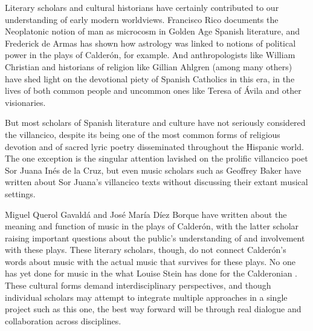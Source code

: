 Literary scholars and cultural historians have certainly contributed to our understanding of early modern worldviews. 
Francisco Rico documents the Neoplatonic notion of man as microcosm in Golden Age Spanish literature, and Frederick de Armas has shown how astrology was linked to notions of political power in the plays of Calderón, for example.%
	\autocites{Rico:PequenoMundo}{DeArmas:Astraea}
And anthropologists like William Christian and historians of religion like Gillian Ahlgren (among many others) have shed light on the devotional piety of Spanish Catholics in this era, in the lives of both common people and uncommon ones like Teresa of Ávila and other visionaries.%
	\autocites{Christian:LocalReligion}{Christian:PersonAndGod}{Ahlgren:TeresaPolitics}

But most scholars of Spanish literature and culture have not seriously considered the villancico, despite its being one of the most common forms of religious devotion and of sacred lyric poetry disseminated throughout the Hispanic world.
The one exception is the singular attention lavished on the prolific villancico poet Sor Juana Inés de la Cruz, but even music scholars such as Geoffrey Baker have written about Sor Juana's villancico texts without discussing their extant musical settings.%
	\autocites{Tenorio:SorJuana}{Tenorio:Gongorismo}{Baker:EthnicVC}

Miguel Querol Gavaldá and José María Díez Borque have written about the meaning and function of music in the plays of Calderón, with the latter scholar raising important questions about the public's understanding of and involvement with these plays. 
These literary scholars, though, do not connect Calderón's words about music with the actual music that survives for these plays.%
	\autocites{Querol:Calderon}{DiezBorque:Publico}
No one has yet done for music in the  what Louise Stein has done for the Calderonian .%
	\autocite{Stein:Songs}
These cultural forms demand interdisciplinary perspectives, and though individual scholars may attempt to integrate multiple approaches in a single project such as this one, the best way forward will be through real dialogue and collaboration across disciplines.

